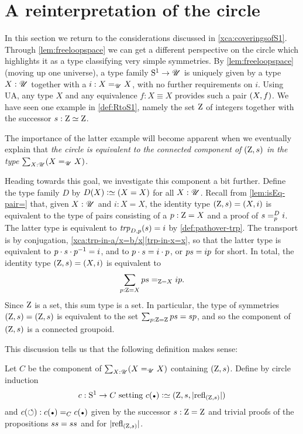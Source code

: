 \section{A reinterpretation of the circle}\label{sec:S1isC}

In this section we return to the considerations discussed in \cref{xca:coveringsofS1}.
Through \cref{lem:freeloopspace} we can get a different perspective on the circle 
which highlights it as a type classifying very simple symmetries.
By \cref{lem:freeloopspace} (moving up one universe), 
a type family ${\mathrm{S}^1}\to{\mathscr{U}}$ is uniquely given by a type $X:{\mathscr{U}}$ together 
with a $i:X=_{\mathscr{U}} X$, with no further requirements on $i$.
Using UA, any type $X$ and any equivalence $f: X\equiv X$ provides such a pair
$(X,{f})$. We have seen one example in \cref{def:RtoS1}, 
namely the set $\mathrm{Z}$ of integers together with the successor $s: \mathrm{Z}\simeq\mathrm{Z}$.

The importance of the latter example will become apparent when we eventually 
explain that \emph{the circle is equivalent to the connected component of 
$(\mathrm{Z},{s})$ in the type $\sum_{X:{\mathscr{U}}}(X=_{{\mathscr{U}}}X)$}. 

Heading towards this goal, we investigate this component a bit further.
Define the type family $D$ by $D(X) \defeq (X=X)$ for all $X:{\mathscr{U}}$.
Recall from \cref{lem:isEq-pair=} that, given $X:{\mathscr{U}}$ and $i: X=X$, 
the identity type $(\mathrm{Z},{s}) = (X,i)$
is equivalent to the type of pairs consisting of a $p:\mathrm{Z}=X$ and 
a proof of $\pathover{\etop{s}}{D}{p}{i}$. The latter type is
equivalent to $\trp[D]{p}(\etop{s}) = i$ by \cref{def:pathover-trp}.
The transport is by conjugation,
\cref{xca:trp-in-a/x=b/x}\ref{trp-in-x=x}, so that the latter
type is equivalent to $p\cdot{s}\cdot p^{-1} = i$, 
and to $p\cdot{s} = i\cdot p$, or $p {s} = i p$ for short. 
In total, the identity type $(\mathrm{Z},{s})=(X,i)$ is equivalent to
\[
\sum_{p: {\mathrm{Z} = X}} {p {s}} =_{\mathrm{Z}=X} {i p}.
\] 
Since $\mathrm{Z}$ is a set, this sum type is a set.
In particular, the type of symmetries $(\mathrm{Z},{s})=(\mathrm{Z},{s})$
is equivalent to the set $\sum_{p:\mathrm{Z}=\mathrm{Z}}p{s}={s}p$,  
and so the component of $(\mathrm{Z},{s})$ is a connected groupoid.

This discussion tells us that the following definition makes sense:

\begin{definition}\label{def:S1toC}
Let $C$ be the component of $\sum_{X:{\mathscr{U}}}(X=_{{\mathscr{U}}}X)$ containing $(\mathrm{Z},{s})$.
Define by circle induction
\[
c:\Sc\to C \text{~setting~} 
c(\base)\defequi (\zet,\etop{s},\trunc{\refl{(\zet,\etop{s})}})
\]
and $c(\Sloop): c(\base)=_C c(\base)$ given by the successor 
${s}:\mathrm{Z}=\mathrm{Z}$ and trivial proofs of the propositions
${s}{s}={s}{s}$ and for $\trunc{\refl{(\zet,\etop{s})}}$. 
\end{definition}

